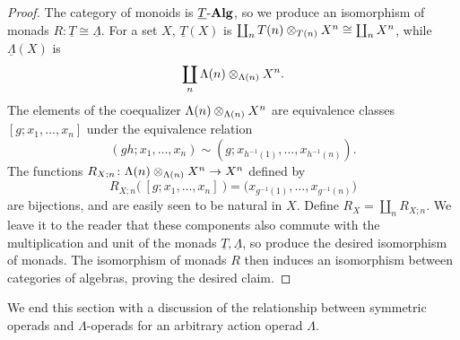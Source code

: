 \begin{proof}
The category of monoids is $\underline{T}\mbox{-}\mb{Alg}$, so we produce an isomorphism of monads $R \colon \underline{T} \cong \underline{\Lambda}$.
For a set $X$, $\underline{T}(X)$ is $\coprod_n \coeq{T}{X}{T}{n} \cong \coprod_n X^n$, while $\underline{\Lambda}(X)$ is
\[
\coprod_n \coeq{\Lambda}{X}{\Lambda}{n}.
\]
The elements of the coequalizer $\coeq{\Lambda}{X}{\Lambda}{n}$ are equivalence classes $[g; x_1, \ldots, x_n]$ under the equivalence relation
	\[
		(gh; x_1, \ldots, x_n) \sim \left(g; x_{h^{-1}(1)}, \ldots, x_{h^{-1}(n)}\right).
	\]
The functions $R_{X;n} \colon \coeq{\Lambda}{X}{\Lambda}{n} \to X^n$ defined by
\[
R_{X;n}\big( \ [g; x_1, \ldots, x_n] \ \big) = \big( x_{g^{-1}(1)}, \ldots, x_{g^{-1}(n)}\big)
\]
are bijections, and are easily seen to be natural in $X$. 
Define $R_X = \coprod_n R_{X;n}$.
We leave it to the reader that these components also commute with the multiplication and unit of the monads $\underline{T}, \underline{\Lambda}$, so produce the desired isomorphism of monads.
The isomorphism of monads $R$ then induces an isomorphism between categories of algebras, proving the desired claim.
%
%
\end{proof}




We end this section with a discussion of the relationship between symmetric operads and $\Lambda$-operads for an arbitrary action operad $\Lambda$.

